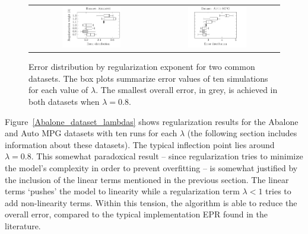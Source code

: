 \documentclass[preprint,authoryear,12pt]{elsarticle}
\begin{document}
\begin{figure}[tb]\begin{center}
\begin{tabular}{cc}
\includegraphics[width=0.49\textwidth]{figure_1a.pdf}
%
&
%
%
\includegraphics[width=0.49\textwidth]{figure_1b.pdf}
\end{tabular}

\caption{Error distribution by regularization exponent for two common datasets. The box plots summarize error values of ten simulations for each value of $\lambda$. The smallest overall error, in grey, is achieved in both datasets when $\lambda=0.8$.}
\label{Abalone_dataset_lambdas}\label{Auto-MPG_dataset_lambdas}

\end{center}\end{figure}

Figure~\ref{Abalone_dataset_lambdas} shows regularization results for the Abalone and Auto MPG datasets with ten runs for each $\lambda$ (the following section  includes information about these datasets). The typical inflection point lies around $\lambda = 0.8$. This somewhat paradoxical result -- since regularization tries to minimize the model's complexity in order to prevent overfitting -- is somewhat justified by the inclusion of the linear terms mentioned in the previous section. The linear terms `pushes' the model to linearity while a regularization term $\lambda < 1$ tries to add non-linearity terms. Within this tension, the algorithm is able to reduce the overall error, compared to the typical implementation \ac{EPR} found in the literature.
\end{document}
